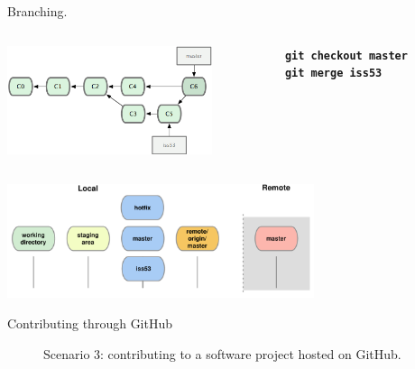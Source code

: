 \documentclass{beamer}
\begin{document}
\begin{frame}{Branching.}
  \begin{columns}
    \begin{column}{0.6\linewidth}
      \begin{center}
        \includegraphics[width=6cm]{figs/18333fig0317-tn}
      \end{center}
    \end{column}
    \begin{column}{0.45\linewidth}
      \begin{center}
        \texttt{\textbf{git checkout master}}\\
        \texttt{\textbf{git merge iss53}}
      \end{center}
    \end{column}
  \end{columns}
  \begin{center}
    \includegraphics[width=9cm]{figs/git-branch2}
  \end{center}
\end{frame}


\begin{frame}{Contributing through GitHub}
  \begin{figure}
    \centering
    Scenario 3: contributing to a software project hosted on GitHub.
  \end{figure}
\end{frame}
\end{document}
